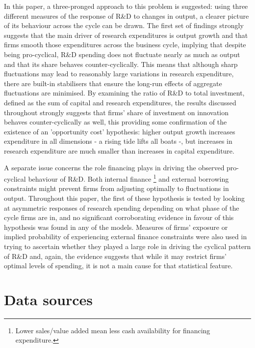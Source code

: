\documentclass{_latex/house}
\begin{document}
In this paper, a three-pronged approach to this problem is suggested: using three different measures of the response of R\&D to changes in output, a clearer picture of its behaviour across the cycle can be drawn. The first set of findings strongly suggests that the main driver of research expenditures is output growth and that firms smooth those expenditures across the business cycle, implying that despite being pro-cyclical, R\&D spending does not fluctuate nearly as much as output and that its share behaves counter-cyclically. This means that although sharp fluctuations may lead to reasonably large variations in research expenditure, there are built-in stabilisers that ensure the long-run effects of aggregate fluctuations are minimised. By examining the ratio of R\&D to total investment, defined as the sum of capital and research expenditures, the results discussed throughout strongly suggests that firms' share of investment on innovation behaves counter-cyclically as well, this providing some confirmation of the existence of an 'opportunity cost' hypothesis: higher output growth increases expenditure in all dimensions - a rising tide lifts all boats -, but increases in research expenditure are much smaller than increases in capital expenditure.

A separate issue concerns the role financing plays in driving the observed pro-cyclical behaviour of R\&D. Both internal finance \footnote{Lower sales/value added mean less cash availability for financing expenditure.} and external borrowing constraints might prevent firms from adjusting optimally to fluctuations in output. Throughout this paper, the first of these hypothesis is tested by looking at asymmetric responses of research spending depending on what phase of the cycle firms are in, and no significant corroborating evidence in favour of this hypothesis was found in any of the models. Measures of firms' exposure or implied probability of experiencing external finance constraints were also used in trying to ascertain whether they played a large role in driving the cyclical pattern of R\&D and, again, the evidence suggests that while it may restrict firms' optimal levels of spending, it is not a main cause for that statistical feature.


\newpage


\newpage

\appendix
\section*{Data sources}
\end{document}
